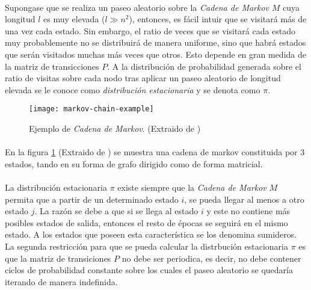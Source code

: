 \documentclass{subfiles}
\begin{document}
        \paragraph{}
        Supongase que se realiza un paseo aleatorio sobre la \emph{Cadena de Markov} $M$ cuya longitud $l$ es muy elevada ($l \gg n^2$), entonces, es fácil intuir que se visitará más de una vez cada estado. Sin embargo, el ratio de veces que se visitará cada estado muy probablemente no se distribuirá de manera uniforme, sino que habrá estados que serán visitados muchas más veces que otros. Esto depende en gran medida de la matriz de transicciones $P$. A la distribución de probabilidad generada sobre el ratio de visitas sobre cada nodo tras aplicar un paseo aleatorio de longitud elevada se le conoce como \emph{distribución estacionaria} y se denota como $\pi$.

        \begin{figure}
          \centering
          \texttt{[image: markov-chain-example]}
          \caption{Ejemplo de \emph{Cadena de Markov}. (Extraido de \cite{sanchez2012wireless})}
          \label{img:markov_chain_example}
        \end{figure}

        \paragraph{}
        En la figura \ref{img:markov_chain_example} (Extraido de \cite{sanchez2012wireless}) se muestra una cadena de markov constituida por 3 estados, tando en su forma de grafo dirigido como de forma matricial.

        \paragraph{}
        La distribución estacionaria $\pi$ existe siempre que la \emph{Cadena de Markov} $M$ permita que a partir de un determinado estado $i$, se pueda llegar al menos a otro estado $j$. La razón se debe a que si se llega al estado $i$ y este no contiene más posibles estados de salida, entonces el resto de épocas se seguirá en el mismo estado. A los estados que poseen esta característica se los denomina sumideros. La segunda restricción para que se pueda calcular la distrbución estacionaria $\pi$ es que la matriz de transiciones $P$ no debe ser periodica, es decir, no debe contener ciclos de probabilidad constante sobre los cuales el paseo aleatorio se quedaría iterando de manera indefinida.
\end{document}
